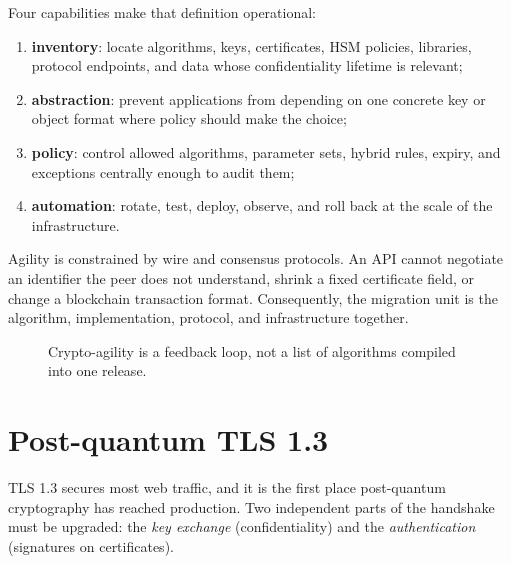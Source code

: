 Four capabilities make that definition operational:

\begin{enumerate}
  \item \textbf{inventory}: locate algorithms, keys, certificates, HSM policies,
        libraries, protocol endpoints, and data whose confidentiality lifetime is
        relevant;
  \item \textbf{abstraction}: prevent applications from depending on one concrete
        key or object format where policy should make the choice;
  \item \textbf{policy}: control allowed algorithms, parameter sets, hybrid rules,
        expiry, and exceptions centrally enough to audit them;
  \item \textbf{automation}: rotate, test, deploy, observe, and roll back at the
        scale of the infrastructure.
\end{enumerate}

Agility is constrained by wire and consensus protocols. An API cannot negotiate
an identifier the peer does not understand, shrink a fixed certificate field, or
change a blockchain transaction format. Consequently, the migration unit is the
algorithm, implementation, protocol, and infrastructure together.

\begin{figure}[H]
\centering
{}
\caption{Crypto-agility is a feedback loop, not a list of algorithms compiled into
one release.}
\end{figure}

\section{Post-quantum TLS 1.3}
TLS 1.3 secures most web traffic, and it is the first place post-quantum cryptography has reached production. Two independent parts of the handshake must be upgraded: the \emph{key exchange} (confidentiality) and the \emph{authentication} (signatures on certificates).

